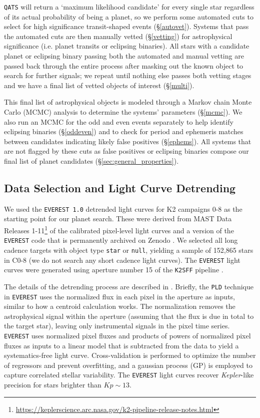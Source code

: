 \documentclass[twocolumn]{aastex62}
\newcommand{\project}[1]{\textsl{#1}}
\newcommand{\pipeline}[1]{\texttt{#1}}
\newcommand{\numstars}{152,865}
\begin{document}
\pipeline{QATS} will return a `maximum likelihood candidate' for every
single star regardless of its actual probability of being a planet, so
we perform some automated cuts to select for high significance
transit-shaped events (\S\ref{autovet}).  Systems that pass the
automated cuts are then manually vetted (\S\ref{vetting}) for
astrophysical significance (i.e. planet transits or eclipsing
binaries). All stars with a candidate planet or eclipsing binary
passing both the automated and manual vetting are passed back through
the entire process after masking out the known object to search for
further signals; we repeat until nothing else passes both vetting
stages and we have a final list of vetted objects of interest
(\S\ref{multi}).

This final list of astrophysical objects is modeled through a Markov
chain Monte Carlo (MCMC) analysis to determine the systems' parameters
(\S\ref{mcmc}). We also run an MCMC for the odd and even events
separately to help identify eclipsing binaries (\S\ref{oddeven}) and
to check for period and ephemeris matches between candidates
indicating likely false positives (\S\ref{ephems}). All systems that
are not flagged by these cuts as false positives or eclipsing binaries
compose our final list of planet candidates
(\S\ref{sec:general_properties}).


\subsection{Data Selection and Light Curve Detrending}
\label{everest}

We used the \texttt{EVEREST 1.0} detrended light curves for K2
campaigns 0-8 \citep{lug16} as the starting point for our planet
search. These were derived from MAST Data Releases
1-11\footnote{\url{https://keplerscience.arc.nasa.gov/k2-pipeline-release-notes.html}}
of the calibrated pixel-level light curves and a version of the
\texttt{EVEREST} code that is permanently archived on Zenodo
\citep{everest}.  We selected all long cadence targets with object
type \texttt{star} or \texttt{null}, yielding a sample of \numstars{}
stars in C0-8 (we do not search any short cadence light curves). The
\pipeline{EVEREST} light curves were generated using aperture number
15 of the \texttt{K2SFF} pipeline \citep{van14,van16b}.

The details of the detrending process are described in \citet{lug16}.
Briefly, the \pipeline{PLD} technique in \pipeline{EVEREST} uses the
normalized flux in each pixel in the aperture as inputs, similar to
how a centroid calculation works. The normalization removes the
astrophysical signal within the aperture (assuming that the flux is
due in total to the target star), leaving only instrumental signals in
the pixel time series. \pipeline{EVEREST} uses normalized pixel fluxes
and products of powers of normalized pixel fluxes as inputs to a
linear model that is subtracted from the data to yield a
systematics-free light curve. Cross-validation is performed to
optimize the number of regressors and prevent overfitting, and a
gaussian process (GP) is employed to capture correlated stellar
variability. The \pipeline{EVEREST} light curves recover
\project{Kepler}-like precision for stars brighter than $Kp \sim 13$.
\end{document}
